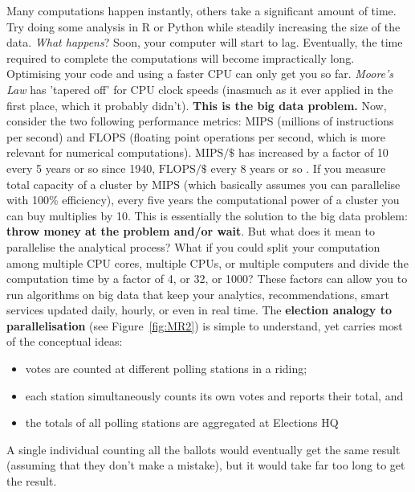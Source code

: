 Many computations happen instantly, others take a significant amount of time. Try doing some analysis in R or Python while steadily increasing the size of the data. \textit{What happens}? Soon, your computer will start to lag. Eventually, the time required to complete the computations will become impractically long. Optimising your code and using a faster CPU can only get you so far. \textit{Moore's Law} has 'tapered off' for CPU clock speeds (inasmuch as it ever applied in the first place, which it probably didn't). \textbf{This is the big data problem.} \newl Now, consider the two following performance metrics: $\textrm{MIPS}$ (millions of instructions per second) and $\textrm{FLOPS}$ (floating point operations per second, which is more relevant for numerical computations). $\textrm{MIPS}/\$$ has increased by a factor of 10 every 5 years or so since 1940, $\textrm{FLOPS}/\$$ every 8 years or so \cite{DSML_BD4}. If you measure total capacity of a cluster by $\textrm{MIPS}$ (which basically assumes you can parallelise with 100\% efficiency), every five years the computational power of a cluster you can buy multiplies by 10. This is essentially the solution to the big data problem: \textbf{throw money at the problem and/or wait}. \newl But what does it mean to parallelise the analytical process? What if you could split your computation among multiple CPU cores, multiple CPUs, or multiple computers and divide the computation time by a factor of 4, or 32, or 1000? These factors can allow you to run algorithms on big data that keep your analytics, recommendations, smart services updated daily, hourly, or even in real time. The \textbf{election analogy to parallelisation} (see Figure~\ref{fig:MR2}) is simple to understand, yet carries most of the conceptual ideas: 
\begin{itemize}[noitemsep]
\item votes are counted at different polling stations in a riding; 
\item each station simultaneously counts its own votes and reports their total, and 
\item the totals of all polling stations are aggregated at Elections HQ 
\end{itemize}
A single individual counting all the ballots would eventually get the same result (assuming that they don't make a mistake), but it would take far too long to get the result.
